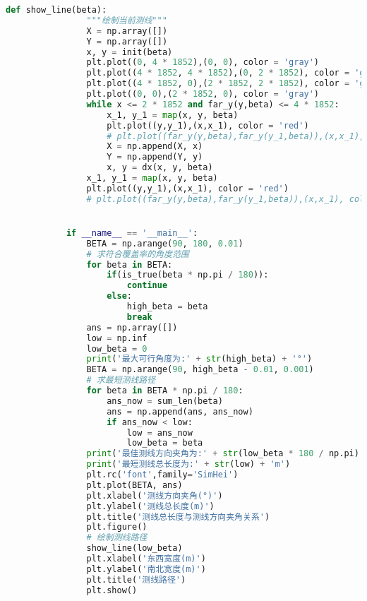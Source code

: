 \documentclass[withoutpreface,bwprint]{cumcmthesis} %
\begin{document}
\begin{appendices}
\begin{lstlisting}[language=python]
            def show_line(beta):
                """绘制当前测线"""
                X = np.array([])
                Y = np.array([])
                x, y = init(beta)
                plt.plot((0, 4 * 1852),(0, 0), color = 'gray')
                plt.plot((4 * 1852, 4 * 1852),(0, 2 * 1852), color = 'gray')
                plt.plot((4 * 1852, 0),(2 * 1852, 2 * 1852), color = 'gray')
                plt.plot((0, 0),(2 * 1852, 0), color = 'gray')
                while x <= 2 * 1852 and far_y(y,beta) <= 4 * 1852:
                    x_1, y_1 = map(x, y, beta)
                    plt.plot((y,y_1),(x,x_1), color = 'red')
                    # plt.plot((far_y(y,beta),far_y(y_1,beta)),(x,x_1), color = 'blue')
                    X = np.append(X, x)
                    Y = np.append(Y, y)
                    x, y = dx(x, y, beta)
                x_1, y_1 = map(x, y, beta)
                plt.plot((y,y_1),(x,x_1), color = 'red')
                # plt.plot((far_y(y,beta),far_y(y_1,beta)),(x,x_1), color = 'blue')


            if __name__ == '__main__':
                BETA = np.arange(90, 180, 0.01)
                # 求符合覆盖率的角度范围
                for beta in BETA:
                    if(is_true(beta * np.pi / 180)):
                        continue
                    else:
                        high_beta = beta
                        break
                ans = np.array([])
                low = np.inf
                low_beta = 0
                print('最大可行角度为:' + str(high_beta) + '°')
                BETA = np.arange(90, high_beta - 0.01, 0.001)
                # 求最短测线路径
                for beta in BETA * np.pi / 180:
                    ans_now = sum_len(beta)
                    ans = np.append(ans, ans_now)
                    if ans_now < low:
                        low = ans_now
                        low_beta = beta
                print('最佳测线方向夹角为:' + str(low_beta * 180 / np.pi) + '°')
                print('最短测线总长度为:' + str(low) + 'm')
                plt.rc('font',family='SimHei')
                plt.plot(BETA, ans)
                plt.xlabel('测线方向夹角(°)')
                plt.ylabel('测线总长度(m)')
                plt.title('测线总长度与测线方向夹角关系')
                plt.figure()
                # 绘制测线路径
                show_line(low_beta)
                plt.xlabel('东西宽度(m)')
                plt.ylabel('南北宽度(m)')
                plt.title('测线路径')
                plt.show()

            \end{lstlisting}


\end{appendices}
\end{document}
